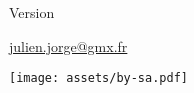 \begin{titlepage}

  \pagestyle{empty}
  \centering

  \makeatletter

  \vspace*{\fill}
  \vspace{-9cm}

  {\Huge\bfseries \@title}

  \vspace{1cm}
  Version \version

  \vfill

  \begin{minipage}{0.85\textwidth}
    \vfill

    \@author

    \href{mailto:julien.jorge@gmx.fr}{julien.jorge@gmx.fr}
  \end{minipage}%
  \hfill%
  \begin{minipage}{0.15\textwidth}%
    \raggedright
    \texttt{[image: assets/by-sa.pdf]}
  \end{minipage}

  \makeatother
\end{titlepage}
